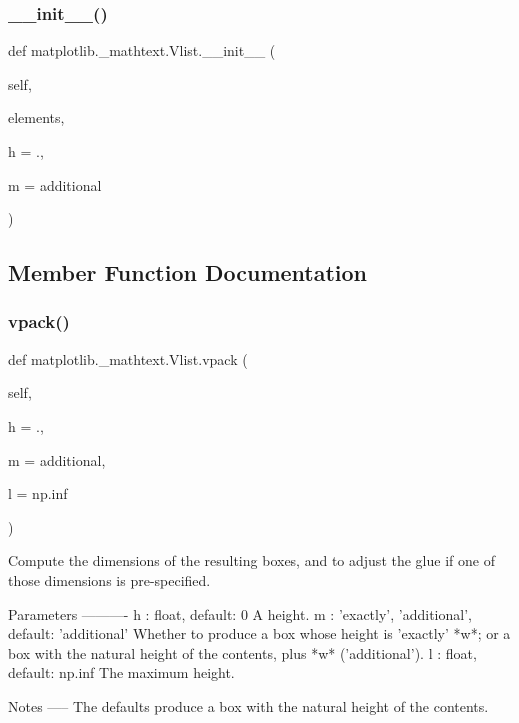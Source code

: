 \subsubsection{\texorpdfstring{\+\_\+\+\_\+init\+\_\+\+\_\+()}{\_\_init\_\_()}}
{\footnotesize\ttfamily def matplotlib.\+\_\+mathtext.\+Vlist.\+\_\+\+\_\+init\+\_\+\+\_\+ (\begin{DoxyParamCaption}\item[{}]{self,  }\item[{}]{elements,  }\item[{}]{h = {.},  }\item[{}]{m = {\ttfamily \textquotesingle{}additional\textquotesingle{}} }\end{DoxyParamCaption})}



\subsection{Member Function Documentation}
\mbox{\label{classmatplotlib_1_1__mathtext_1_1Vlist_af4e54214ba112cfa274e7f5786cf2ae2}} 
\subsubsection{\texorpdfstring{vpack()}{vpack()}}
{\footnotesize\ttfamily def matplotlib.\+\_\+mathtext.\+Vlist.\+vpack (\begin{DoxyParamCaption}\item[{}]{self,  }\item[{}]{h = {.},  }\item[{}]{m = {\ttfamily \textquotesingle{}additional\textquotesingle{}},  }\item[{}]{l = {\ttfamily np.inf} }\end{DoxyParamCaption})}

\begin{DoxyVerb}Compute the dimensions of the resulting boxes, and to adjust the glue
if one of those dimensions is pre-specified.

Parameters
----------
h : float, default: 0
    A height.
m : {'exactly', 'additional'}, default: 'additional'
    Whether to produce a box whose height is 'exactly' *w*; or a box
    with the natural height of the contents, plus *w* ('additional').
l : float, default: np.inf
    The maximum height.

Notes
-----
The defaults produce a box with the natural height of the contents.
\end{DoxyVerb}
 

